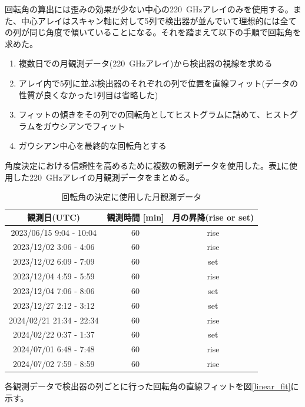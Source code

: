 回転角の算出には歪みの効果が少ない中心の\SI{220}{GHz}アレイのみを使用する。また、中心アレイはスキャン軸に対して5列で検出器が並んでいて理想的には全ての列が同じ角度で傾いていることになる。それを踏まえて以下の手順で回転角を求めた。
\begin{enumerate}
  \item 複数日での月観測データ(\SI{220}{GHz}アレイ)から検出器の視線を求める
  \item アレイ内で5列に並ぶ検出器のそれぞれの列で位置を直線フィット(データの性質が良くなかった1列目は省略した)
  \item フィットの傾きをその列での回転角としてヒストグラムに詰めて、ヒストグラムをガウシアンでフィット
  \item ガウシアン中心を最終的な回転角とする
\end{enumerate}
角度決定における信頼性を高めるために複数の観測データを使用した。表\ref{angle_cal_tods}に使用した\SI{220}{GHz}アレイの月観測データをまとめる。
\begin{table}[htbp]
  \centering
  \caption{回転角の決定に使用した月観測データ}
  \vspace{3mm}
  \begin{tabular}{ccc} \hline
    観測日(UTC) & 観測時間 [min]  & 月の昇降(rise or set) \\ \hline
    2023/06/15 9:04 - 10:04 & 60 & rise \\
    2023/12/02 3:06 - 4:06 & 60 & rise \\
    2023/12/02 6:09 - 7:09 & 60 & set \\
    2023/12/04 4:59 - 5:59 & 60 & rise \\
    2023/12/04 7:06 - 8:06 & 60 & set \\
    2023/12/27 2:12 - 3:12 & 60 & set \\
    2024/02/21 21:34 - 22:34 & 60 & rise \\
    2024/02/22 0:37 - 1:37 & 60 & set \\
    2024/07/01 6:48 - 7:48 & 60 & rise \\
    2024/07/02 7:59 - 8:59 & 60 & rise \\ \hline

  \end{tabular}
  \label{angle_cal_tods}
\end{table}
各観測データで検出器の列ごとに行った回転角の直線フィットを図\ref{linear_fit}に示す。
